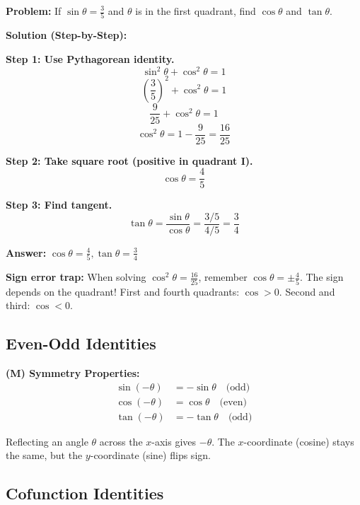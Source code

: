 \documentclass[12pt]{extarticle}
\begin{document}
\begin{examplebox}
\textbf{Problem:} If $\sin\theta = \frac{3}{5}$ and $\theta$ is in the first quadrant, find $\cos\theta$ and $\tan\theta$.

\textbf{Solution (Step-by-Step):}

\textbf{Step 1: Use Pythagorean identity.}
\[
\sin^2\theta + \cos^2\theta = 1
\]
\[
\left(\frac{3}{5}\right)^2 + \cos^2\theta = 1
\]
\[
\frac{9}{25} + \cos^2\theta = 1
\]
\[
\cos^2\theta = 1 - \frac{9}{25} = \frac{16}{25}
\]

\textbf{Step 2: Take square root (positive in quadrant I).}
\[
\cos\theta = \frac{4}{5}
\]

\textbf{Step 3: Find tangent.}
\[
\tan\theta = \frac{\sin\theta}{\cos\theta} = \frac{3/5}{4/5} = \frac{3}{4}
\]

\textbf{Answer:} $\cos\theta = \boxed{\frac{4}{5}}, \tan\theta = \boxed{\frac{3}{4}}$
\end{examplebox}

\begin{warningbox}
\textbf{Sign error trap:} When solving $\cos^2\theta = \frac{16}{25}$, remember $\cos\theta = \pm\frac{4}{5}$. The sign depends on the quadrant! First and fourth quadrants: $\cos > 0$. Second and third: $\cos < 0$.
\end{warningbox}

\subsection{Even-Odd Identities}

\begin{theorembox}
\textbf{(M) Symmetry Properties:}
\begin{align*}
\sin(-\theta) &= -\sin\theta \quad \text{(odd)} \\
\cos(-\theta) &= \cos\theta \quad \text{(even)} \\
\tan(-\theta) &= -\tan\theta \quad \text{(odd)}
\end{align*}
\end{theorembox}

\begin{conceptbox}
Reflecting an angle $\theta$ across the $x$-axis gives $-\theta$. The $x$-coordinate (cosine) stays the same, but the $y$-coordinate (sine) flips sign.
\end{conceptbox}

\subsection{Cofunction Identities}
\end{document}
